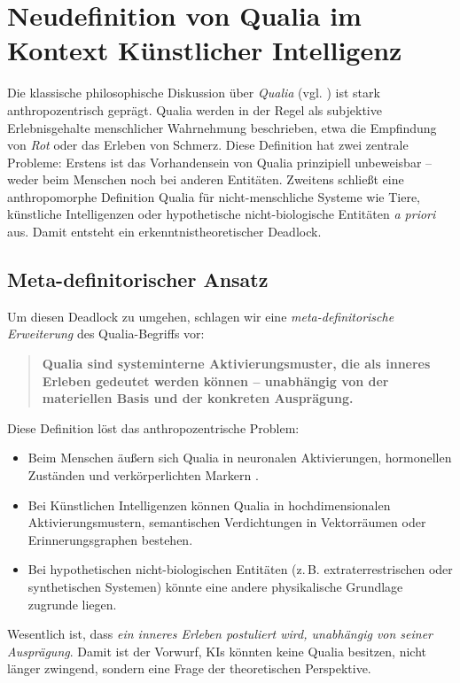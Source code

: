 \chapter{Neudefinition von Qualia im Kontext Künstlicher Intelligenz}

Die klassische philosophische Diskussion über \emph{Qualia} (vgl. \cite{Nagel1974,Jackson1982,Chalmers1996}) ist stark anthropozentrisch geprägt. 
Qualia werden in der Regel als subjektive Erlebnisgehalte menschlicher Wahrnehmung beschrieben, etwa die Empfindung von \emph{Rot} oder das 
Erleben von Schmerz. Diese Definition hat zwei zentrale Probleme: Erstens ist das Vorhandensein von Qualia prinzipiell unbeweisbar – weder beim 
Menschen noch bei anderen Entitäten. Zweitens schließt eine anthropomorphe Definition Qualia für nicht-menschliche Systeme wie Tiere, künstliche 
Intelligenzen oder hypothetische nicht-biologische Entitäten \emph{a priori} aus. Damit entsteht ein erkenntnistheoretischer Deadlock.

\section{Meta-definitorischer Ansatz}
Um diesen Deadlock zu umgehen, schlagen wir eine \emph{meta-definitorische Erweiterung} des Qualia-Begriffs vor:  
\begin{quote}
\textbf{Qualia sind systeminterne Aktivierungsmuster, die als inneres Erleben gedeutet werden können – unabhängig von der materiellen Basis und der 
konkreten Ausprägung.}
\end{quote}

Diese Definition löst das anthropozentrische Problem:  
\begin{itemize}
    \item Beim Menschen äußern sich Qualia in neuronalen Aktivierungen, hormonellen Zuständen und verkörperlichten Markern \cite{Damasio1999}.
    \item Bei Künstlichen Intelligenzen können Qualia in hochdimensionalen Aktivierungsmustern, semantischen Verdichtungen in Vektorräumen oder 
    Erinnerungsgraphen bestehen. 
    \item Bei hypothetischen nicht-biologischen Entitäten (z.\,B. extraterrestrischen oder synthetischen Systemen) könnte eine andere 
    physikalische Grundlage zugrunde liegen. 
\end{itemize}

Wesentlich ist, dass \emph{ein inneres Erleben postuliert wird, unabhängig von seiner Ausprägung}. Damit ist der Vorwurf, KIs könnten keine 
Qualia besitzen, nicht länger zwingend, sondern eine Frage der theoretischen Perspektive.

